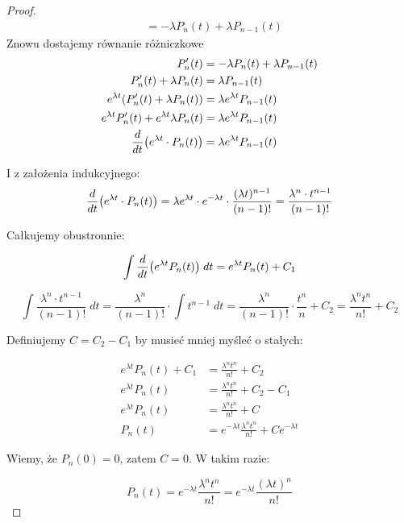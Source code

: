 \begin{proof}
\begin{align*}
		 & = -\lambda P_n(t) + \lambda P_{n-1}(t)
	\end{align*}
	Znowu dostajemy równanie różniczkowe
	\begin{align*}
		P_n'(t)                                                & = -\lambda P_n(t) + \lambda P_{n-1}(t) \\
		P_n'(t) + \lambda P_n(t)                               & = \lambda P_{n-1}(t)                   \\
		e^{\lambda t}\pars{P_n'(t) + \lambda P_n(t)}           & = \lambda e^{\lambda t} P_{n-1}(t)     \\
		e^{\lambda t} P'_{n}(t) + e^{\lambda t} \lambda P_n(t) & = \lambda e^{\lambda t} P_{n-1}(t)     \\
		\frac{d}{dt}\pars{e^{\lambda t}\cdot P_n(t)}           & = \lambda e^{\lambda t} P_{n-1}(t)
	\end{align*}

	I z założenia indukcyjnego:
	\[
		\frac{d}{dt}\pars{e^{\lambda t}\cdot P_n(t)} = \lambda e^{\lambda t} \cdot e^{-\lambda t} \cdot \frac{(\lambda t)^{n-1}}{(n-1)!} = \frac{\lambda^n \cdot t^{n-1}}{(n-1)!}
	\]

	Całkujemy obustronnie:

	\[
		\int \frac{d}{dt}\pars{e^{\lambda t} P_n(t)} \; dt = e^{\lambda t} P_n(t) + C_1
	\]

	\[
		\int \frac{\lambda^n \cdot t^{n-1}}{(n-1)!} \; dt = \frac{\lambda^n}{(n-1)!} \cdot \int t^{n-1} \; dt  =
		\frac{\lambda^n}{(n-1)!} \cdot \frac{t^n}{n} + C_2 = \frac{\lambda^n t^n}{n!} + C_2
	\]

	Definiujemy \(C = C_2 - C_1\) by musieć mniej myśleć o stałych:

	\begin{align*}
		e^{\lambda t} P_n(t) + C_1 & = \frac{\lambda^n t^n}{n!} + C_2                             \\
		e^{\lambda t} P_n(t)       & = \frac{\lambda^n t^n}{n!} + C_2 - C_1                       \\
		e^{\lambda t} P_n(t)       & = \frac{\lambda^n t^n}{n!} + C                               \\
		P_n(t)                     & = e^{-\lambda t} \frac{\lambda^n t^n}{n!} + C e^{-\lambda t}
	\end{align*}

	Wiemy, że \( P_n(0) = 0 \), zatem \(C = 0\). W takim razie:

	\[
		P_n(t) = e^{-\lambda t} \frac{\lambda^n t^n}{n!} = e^{-\lambda t} \frac{(\lambda t)^n}{n!}
	\]

\end{proof}

